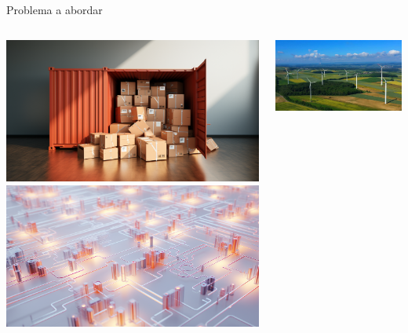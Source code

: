 \documentclass[14pt, aspectratio = 1610, xcolor=table, structureblod]{beamer}
\begin{document}
\begin{frame}{Problema a abordar}
	\vskip -5pt%
	\vskip 6pt%
	\begin{columns}[totalwidth = 0.89\textwidth]
	\begin{column}{0.43\linewidth}
		\includegraphics[width = \linewidth]{bin_packing}
		\vskip 0.3cm%
		\includegraphics[width = \linewidth]{circuits}
	\end{column}
	\begin{column}{0.43\linewidth}
		\includegraphics[width = \linewidth]{eolic_park}

\end{column}
\end{columns}
\end{frame}
\end{document}
